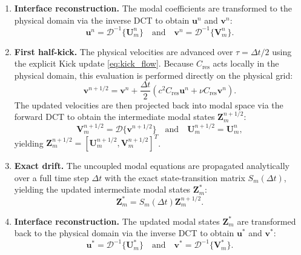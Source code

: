 \documentclass{Configuration_Files/PoliMi3i_thesis}
\begin{document}
\begin{enumerate}

\item
\textbf{Interface reconstruction.}
The modal coefficients are transformed to the physical domain via the inverse DCT to obtain $\mathbf u^n$ and $\mathbf v^n$:
\begin{equation*}
    \mathbf{u}^n = \mathcal{D}^{-1} \{ \mathbf{U}_m^n \} \quad \text{and} \quad \mathbf{v}^n = \mathcal{D}^{-1} \{ \mathbf{V}_m^n \}.
\end{equation*}

\item
\textbf{First half-kick.}
The physical velocities are advanced over $\tau = \Delta t/2$ using the explicit Kick update \eqref{eq:kick_flow}. Because $C_{\mathrm{res}}$ acts locally in the physical domain, this evaluation is performed directly on the physical grid:
\begin{equation*}
    \mathbf{v}^{n+1/2} = \mathbf{v}^n + \frac{\Delta t}{2} \left( c^2 C_{\mathrm{res}} \mathbf{u}^n + \nu C_{\mathrm{res}} \mathbf{v}^n \right).
\end{equation*}
The updated velocities are then projected back into modal space via the forward DCT to obtain the intermediate modal states $\mathbf Z_m^{n+1/2}$:
\begin{equation*}
    \mathbf{V}_m^{n+1/2} = \mathcal{D} \{ \mathbf{v}^{n+1/2} \} \quad \text{and} \quad \mathbf{U}_m^{n+1/2} = \mathbf{U}_m^n,
\end{equation*}
yielding $\mathbf{Z}_m^{n+1/2} = [\mathbf{U}_m^{n+1/2}, \mathbf{V}_m^{n+1/2}]^T$.

\item
\textbf{Exact drift.}
The uncoupled modal equations are propagated analytically over a full time step $\Delta t$ with the exact state-transition matrix $S_m(\Delta t)$, yielding the updated intermediate modal states $\mathbf Z_m^*$:
\begin{equation*}
    \mathbf{Z}_m^* = S_m(\Delta t) \mathbf{Z}_m^{n+1/2}.
\end{equation*}

\item
\textbf{Interface reconstruction.}
The updated modal states $\mathbf Z_m^*$ are transformed back to the physical domain via the inverse DCT to obtain $\mathbf u^*$ and $\mathbf v^*$:
\begin{equation*}
    \mathbf{u}^* = \mathcal{D}^{-1} \{ \mathbf{U}_m^* \} \quad \text{and} \quad \mathbf{v}^* = \mathcal{D}^{-1} \{ \mathbf{V}_m^* \}.
\end{equation*}


\end{enumerate}
\end{document}
